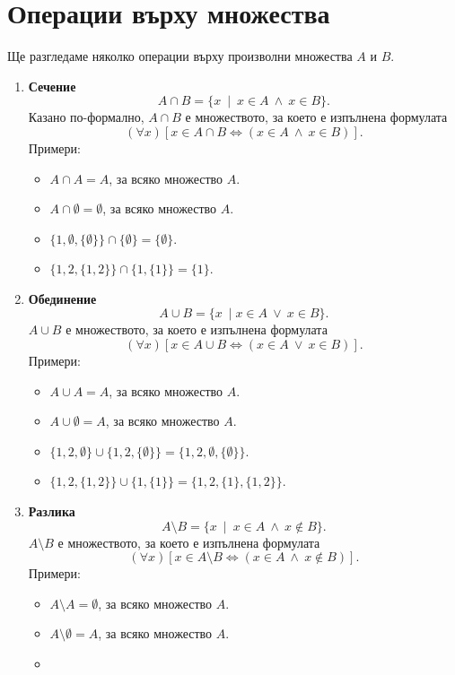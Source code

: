\section{Операции върху множества}

Ще разгледаме няколко операции върху произволни множества $A$ и $B$.
\begin{enumerate}[{\bf (I)}]
\item
  {\bf Сечение}
  \[A\cap B = \{x\ \mid\ x\in A\ \wedge\ x\in B\}.\]
  Казано по-формално, $A\cap B$ е множеството, за което е изпълнена формулата
  \[(\forall x)[x \in A\cap B \iff (x\in A\ \wedge\ x \in B)].\]
  Примери:
  \begin{itemize}
  \item
    $A \cap A = A$, за всяко множество $A$.
  \item
    $A \cap \emptyset = \emptyset$, за всяко множество $A$.
  \item
    $\{1,\emptyset,\{\emptyset\}\} \cap \{\emptyset\} = \{\emptyset\}$.
    \item
      $\{1,2,\{1,2\}\} \cap \{1,\{1\}\} = \{1\}$.
    \end{itemize}
  \item
    {\bf Обединение}
    \[A\cup B = \{x\ \mid x\in A\ \vee\ x\in B\}.\]
    $A\cup B$ е множеството, за което е изпълнена формулата
    \[(\forall x)[x \in A\cup B \iff (x\in A\ \vee\ x \in B)].\]
    Примери:
    \begin{itemize}
    \item
      $A \cup A = A$, за всяко множество $A$.
    \item 
      $A \cup \emptyset = A$, за всяко множество $A$.
    \item
      $\{1,2,\emptyset\} \cup \{1,2,\{\emptyset\}\} = \{1,2,\emptyset,\{\emptyset\}\}$.
    \item
      $\{1,2,\{1,2\}\} \cup \{1,\{1\}\} = \{1,2,\{1\},\{1,2\}\}$.
    \end{itemize}
  \item
    {\bf Разлика}
    \[A\setminus B = \{x\ \mid\ x\in A\ \wedge\ x\not\in B\}.\]
    $A\setminus B$ е множеството, за което е изпълнена формулата
    \[(\forall x)[x \in A\setminus B \iff (x\in A\ \wedge\ x \not\in B)].\]
    Примери:
    \begin{itemize}
    \item
      $A \setminus A = \emptyset$, за всяко множество $A$.
    \item 
      $A \setminus \emptyset = A$, за всяко множество $A$.
    \item 

\end{itemize}
\end{enumerate}

